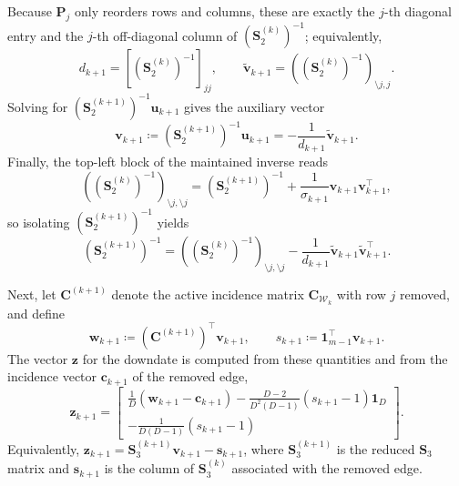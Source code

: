 \documentclass[a4paper,12pt,openany]{book}
\newcommand{\C}{\mathbf{C}}
\renewcommand{\c}{\mathbf{c}}
\newcommand{\s}{\mathbf{s}}
\renewcommand{\u}{\mathbf{u}}
\renewcommand{\v}{\mathbf{v}}
\newcommand{\w}{\mathbf{w}}
\newcommand{\z}{\mathbf{z}}
\begin{document}
\begin{appendices}
Because $\mathbf{P}_j$ only reorders rows and columns, these are exactly the $j$-th diagonal entry and the $j$-th off-diagonal column of $(\mathbf{S}_2^{(k)})^{-1}$; equivalently,
\begin{equation}
	d_{k+1}=[(\mathbf{S}_2^{(k)})^{-1}]_{jj},
	\qquad
	\tilde{\v}_{k+1}=((\mathbf{S}_2^{(k)})^{-1})_{\setminus j,j}.
\end{equation}
Solving for $(\mathbf{S}_2^{(k+1)})^{-1}\u_{k+1}$ gives the auxiliary vector
\begin{equation}
	\label{eq:v_downdate}
	\v_{k+1}\coloneqq(\mathbf{S}_2^{(k+1)})^{-1}\u_{k+1}=-\frac{1}{d_{k+1}}\tilde{\v}_{k+1}.
\end{equation}
Finally, the top-left block of the maintained inverse reads
\begin{equation}
	((\mathbf{S}_2^{(k)})^{-1})_{\setminus j,\setminus j}
	=
	(\mathbf{S}_2^{(k+1)})^{-1}+\frac{1}{\sigma_{k+1}}\v_{k+1}\v_{k+1}^\top,
\end{equation}
so isolating $(\mathbf{S}_2^{(k+1)})^{-1}$ yields
\begin{equation}
	\label{eq:S2_inv_downdate}
	(\mathbf{S}_2^{(k+1)})^{-1}
	=
	((\mathbf{S}_2^{(k)})^{-1})_{\setminus j,\setminus j}
	-
	\frac{1}{d_{k+1}}\tilde{\v}_{k+1}\tilde{\v}_{k+1}^\top.
\end{equation}

Next, let $\C^{(k+1)}$ denote the active incidence matrix $\C_{\mathcal{W}_k}$ with row $j$ removed, and define
\begin{equation}
	\w_{k+1}\coloneqq(\C^{(k+1)})^\top\v_{k+1},
	\qquad
	s_{k+1}\coloneqq\mathbf{1}_{m-1}^\top\v_{k+1}.
\end{equation}
The vector $\z$ for the downdate is computed from these quantities and from the incidence vector $\c_{k+1}$ of the removed edge,
\begin{equation}
	\label{eq:z_downdate_remove}
	\z_{k+1}
	=
	\begin{bmatrix}
		\displaystyle\frac{1}{D}(\w_{k+1}-\c_{k+1})-\frac{D-2}{D^2(D-1)}(s_{k+1}-1)\mathbf{1}_D \\[10pt]
		\displaystyle-\frac{1}{D(D-1)}(s_{k+1}-1)
	\end{bmatrix}.
\end{equation}
Equivalently, $\z_{k+1}=\mathbf{S}_3^{(k+1)}\v_{k+1}-\s_{k+1}$, where $\mathbf{S}_3^{(k+1)}$ is the reduced $\mathbf{S}_3$ matrix and $\s_{k+1}$ is the column of $\mathbf{S}_3^{(k)}$ associated with the removed edge.


\end{appendices}
\end{document}
